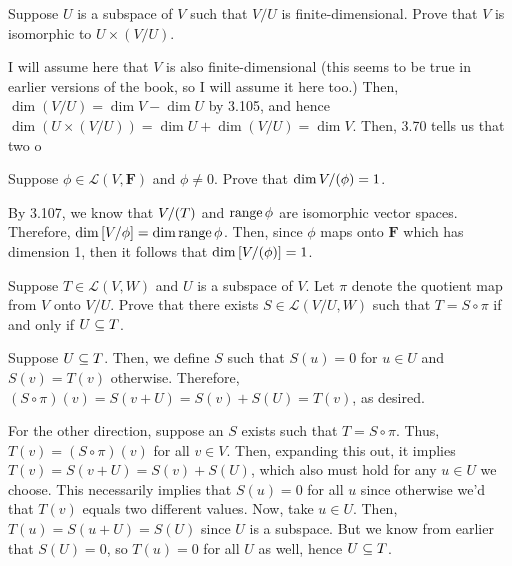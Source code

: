 \documentclass[10pt]{article}
\begin{document}
	\begin{problem}
		Suppose \( U \) is a subspace of \( V \) such that \( V / U \) is finite-dimensional. Prove that \( V
		\) is isomorphic to \( U \times (V / U) \). 
	\end{problem}

	\begin{solution}
		I will assume here that \( V \) is also finite-dimensional (this seems to be true in earlier versions
		of the book, so I will assume it here too.) Then, \( \dim (V / U) = \dim V - \dim U \) by 3.105, and
		hence \( \dim (U \times (V / U)) = \dim U + \dim (V / U) = \dim V \). Then, 3.70 tells us that two o
	\end{solution}

	\begin{problem}
		Suppose \( \phi \in \mathcal{L}(V, \mathbf{F}) \) and \( \phi \neq 0  \). Prove that \( \dim V /
		(\null \phi) = 1 \). 
	\end{problem}

	\begin{solution}
		By 3.107, we know that \( V / (\null T) \) and \( \operatorname*{range} \phi \) are isomorphic vector spaces.
		Therefore, \( \dim \left[ V / \null \phi \right] = \dim \range \phi \). Then, since \( \phi \) maps
		onto \( \mathbf{F} \) which has dimension 1, then it follows that \( \dim \left[ V / (\null \phi)
		\right] = 1 \). 
	\end{solution}

	\begin{problem}
		Suppose \( T \in \mathcal{L}(V, W) \) and \( U \) is a subspace of \( V \). Let \( \pi \) denote the
		quotient map from \( V \) onto \( V / U \). Prove that there exists \( S \in \mathcal{L}(V / U, W) \)
		such that \( T = S \circ \pi \) if and only if \( U \subseteq \null T \). 
	\end{problem}

	\begin{solution}
		Suppose \( U \subseteq \null T \). Then, we define \( S \) such that \( S(u) = 0 \) for \( u \in U \)
		and \( S(v) = T(v) \) otherwise. Therefore, \( (S \circ \pi)(v) = S(v + U) = S(v) + S(U) = T(v) \),
		as desired. 

		For the other direction, suppose an \( S \) exists such that \( T = S \circ \pi \). Thus, \( T(v) =
		(S \circ \pi) (v)  \) for all \( v \in V \). Then, expanding this out, it implies \( T(v) = S(v + U)
		= S(v) + S(U) \), which also must hold for any \( u \in U \) we choose. This necessarily implies
		that \( S(u) = 0 \) for all \( u \) since otherwise we'd that \( T(v) \) equals two different values.
		Now, take \( u \in U \). Then, \( T(u) = S(u + U) = S(U) \) since \( U \) is a subspace. But we know
		from earlier that \( S(U) = 0 \), so \( T(u) = 0 \) for all \( U \) as well, hence \( U \subseteq
		\null T \). 
	\end{solution}
\end{document}

